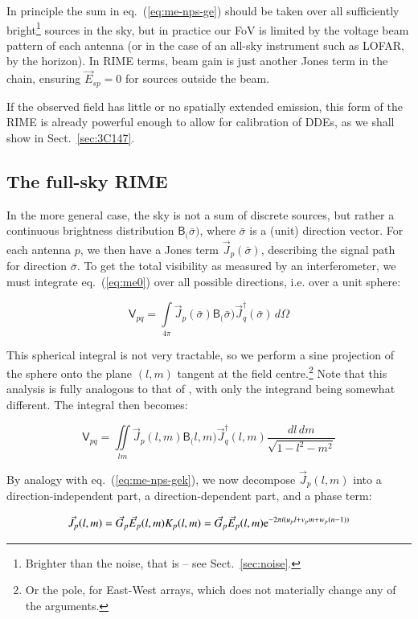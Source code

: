 \documentclass[]{aa}
\newcommand{\jones}[2]{\vec {#1}_{#2}}
\newcommand{\jonesT}[2]{\vec {#1}^\dagger_{#2}}
\newcommand{\coh}[2]{\mathsf{{#1}}_{{#2}}}
\begin{document}
In principle the sum in eq.~(\ref{eq:me-nps-ge}) should be taken over all sufficiently bright\footnote{Brighter than the noise, that is -- see Sect.~\ref{sec:noise}.} sources in the sky, but in practice our FoV is limited by the voltage beam pattern of each antenna (or in the case of an all-sky instrument such as LOFAR, by the horizon). In RIME terms, beam gain is just another Jones term in the chain, ensuring $\jones{E}{sp}=0$ for sources outside the beam.

If the observed field has little or no spatially extended emission, this form of the RIME is already powerful enough to allow for calibration of DDEs, as we shall show in Sect.~\ref{sec:3C147}.

\subsection{The full-sky RIME\label{sec:full-sky-rime}}

In the more general case, the sky is not a sum of discrete sources, but rather a continuous brightness distribution $\coh{B}(\bar\sigma)$, where $\bar\sigma$ is a (unit) direction vector. For each antenna $p$, we then have a Jones term $\jones{J}{p}(\bar\sigma)$, describing the signal path for direction $\bar\sigma$. To get the total visibility as measured by an interferometer, we must integrate eq.~(\ref{eq:me0}) over all possible directions, i.e. over a unit sphere:

\[
\coh{V}{pq} = \int\limits_{4\pi} \jones{J}{p}(\bar\sigma) \coh{B}(\bar\sigma) \jonesT{J}{q}(\bar\sigma) \, d\Omega
\]

This spherical integral is not very tractable, so we perform a sine projection of the sphere onto the plane $(l,m)$ tangent at the field centre.\footnote{Or the pole, for East-West arrays, which does not materially change any of the arguments.} Note that this analysis is fully analogous to that of \citet[Sect.~3.1]{tms}, with only the integrand being somewhat different. The integral then becomes:

\[
\coh{V}{pq} = \iint\limits_{lm} \jones{J}{p}(l,m) \coh{B}(l,m) \jonesT{J}{q}(l,m) \frac{dl\,dm}{\sqrt{1-l^2-m^2}}
\]

By analogy with eq.~(\ref{eq:me-nps-gek}), we now decompose $\jones{J}{p}(l,m)$ into a direction-independent part, a direction-dependent part, and a phase term:

\[
\jones{J}{p}(l,m) = \jones{G}{p}\jones{E}{p}(l,m) K_p(l,m) = \jones{G}{p}\jones{E}{p}(l,m) {\rm e}^{-2\pi i(u_p l+v_p m+w_p (n-1))}
\]
\end{document}
